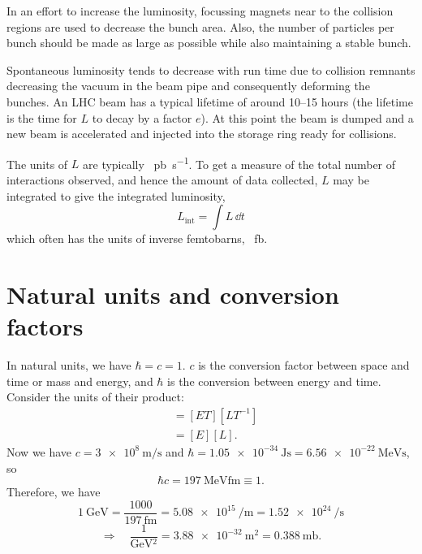 In an effort to increase the luminosity, focussing magnets near to the collision regions are used to decrease the bunch area. Also, the number of particles per bunch should be made as large as possible while also maintaining a stable bunch.

Spontaneous luminosity tends to decrease with run time due to collision remnants decreasing the vacuum in the beam pipe and consequently deforming the bunches. An LHC beam has a typical lifetime of around 10--15 hours (the lifetime is the time for $L$ to decay by a factor $e$). At this point the beam is dumped and a new beam is accelerated and injected into the storage ring ready for collisions.

The units of $L$ are typically \si{\per \pico\barn \per \second}. To get a measure of the total number of interactions observed, and hence the amount of data collected, $L$ may be integrated to give the integrated luminosity,
\begin{equation}\boxed{
L_\text{int} = \int L \, \dd t
}
\end{equation}
which often has the units of inverse femtobarns, \si{\per \femto \barn}.

\section{Natural units and conversion factors}
In natural units, we have $\hbar = c = 1$. $c$ is the conversion factor between space and time or mass and energy, and $\hbar$ is the conversion between energy and time. Consider the units of their product:
\begin{align}
[\hbar c] &= [ET][LT^{-1}] \nonumber \\
&= [E][L].
\end{align}
Now we have $c = \SI{3e8}{\meter\per\second}$ and $\hbar = \SI{1.05e-34}{\joule\second} = \SI{6.56e-22}{\mega\electronvolt\second}$, so
\begin{equation}\boxed{
\hbar c = \SI{197}{\mega \electronvolt \femto \meter} \equiv 1}.
\end{equation}
Therefore, we have
\begin{equation}
\SI{1}{\giga\electronvolt} = \frac{1000}{\SI{197}{\femto\meter}} = \SI{5.08e15}{\per\meter} = \SI{1.52e24}{\per\second}
\end{equation}
\begin{equation}
\Rightarrow\quad \frac{1}{\si{\giga\electronvolt^2}} = \SI{3.88e-32}{\meter^2} = \SI{0.388}{\milli\barn}.
\end{equation}
